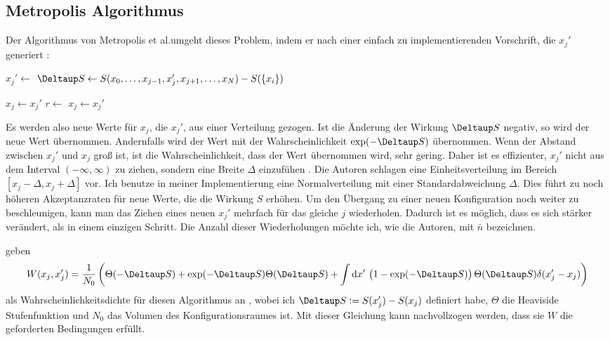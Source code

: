 \subsection{Metropolis Algorithmus}

Der Algorithmus von Metropolis et al.\@ umgeht dieses Problem, indem er nach
einer einfach zu implementierenden Vorschrift, die $x_j'$ generiert
\parencite[439]{Creutz/Statistical_Approach_QM}:

\begin{algorithmic}
        \State $x_j' \gets$ 
        \State $\Deltaup S \gets S(x_0, \ldots, x_{j-1}, x_j',
        x_{j+1}, \ldots, x_N) - S(\{x_i\})$

            \State $x_j \gets x_j'$
        \Else
            \State $r \gets$ 
                \State $x_j \gets x_j'$
            \EndIf
        \EndIf
    \EndFor
\end{algorithmic}

Es werden also neue Werte für $x_j$, die $x_j'$, aus einer Verteilung gezogen.
Ist die Änderung der Wirkung $\Deltaup S$ negativ, so wird der neue Wert
übernommen. Andernfalls wird der Wert mit der Wahrscheinlichkeit
$\exp(-\Deltaup S)$ übernommen. Wenn der Abstand zwischen $x_j'$ und $x_j$ groß
ist, ist die Wahrscheinlichkeit, dass der Wert übernommen wird, sehr gering.
Daher ist es effizienter, $x_j'$ nicht aus dem Interval $(-\infty, \infty)$ zu
ziehen, sondern eine Breite $\Delta$ einzufühen
\parencite[439]{Creutz/Statistical_Approach_QM}. Die Autoren schlagen eine
Einheitsverteilung im Bereich $[x_j - \Delta, x_j + \Delta]$ vor. Ich benutze
in meiner Implementierung eine Normalverteilung mit einer Standardabweichung
$\Delta$. Dies führt zu noch höheren Akzeptanzraten für neue Werte, die die
Wirkung $S$ erhöhen. Um den Übergang zu einer neuen Konfiguration noch weiter
zu beschleunigen, kann man das Ziehen eines neuen $x_j'$ mehrfach für das
gleiche $j$ wiederholen. Dadurch ist es möglich, dass es sich stärker
verändert, als in einem einzigen Schritt. Die Anzahl dieser Wiederholungen
möchte ich, wie die Autoren, mit $\bar n$ bezeichnen.

\citeauthor{Creutz/Statistical_Approach_QM} geben
\[
    W(x_j, x_j') = \frac1{N_0} \del{
        \Theta(-\Deltaup S) + \exp(- \Deltaup S) \Theta(\Deltaup S)
        + \int \dif x' \, \del{
            1 - \exp(-\Deltaup S)
        } \Theta(\Deltaup S) \delta(x_j' - x_j)
    }
\]
als Wahrscheinlichkeitsdichte für diesen Algorithmus an
\parencite[(3.28)]{Creutz/Statistical_Approach_QM}, wobei ich $\Deltaup S :=
S(x_j') - S(x_j)$ definiert habe, $\Theta$ die Heaviside Stufenfunktion und
$N_0$ das Volumen des Konfigurationsraumes ist. Mit dieser Gleichung kann
nachvollzogen werden, dass sie $W$ die geforderten Bedingungen erfüllt.

